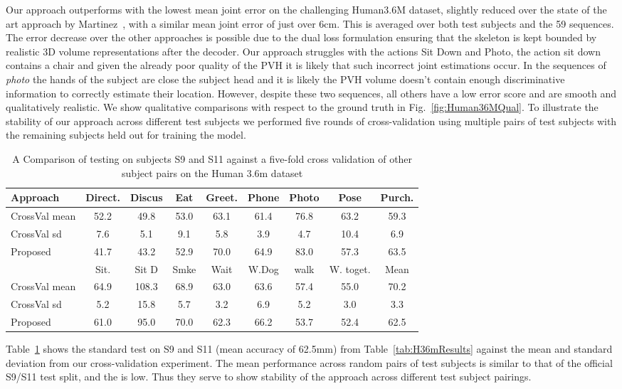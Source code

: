 \documentclass[runningheads]{llncs}
\begin{document}
Our approach outperforms with the lowest mean joint error on the challenging Human3.6M dataset, slightly reduced over the state of the art approach by Martinez~\cite{martinez_simple_2017}, with a similar mean joint error of just over 6cm. This is averaged over both test subjects and the 59 sequences. The error decrease over the other approaches is possible due to the dual loss formulation ensuring that the skeleton is kept bounded by realistic 3D volume representations after the decoder. Our approach struggles with the actions Sit Down and Photo, the action sit down contains a chair and given the already poor quality of the PVH it is likely that such incorrect joint estimations occur. In the sequences of \emph{photo} the hands of the subject are close the subject head and it is likely the PVH volume doesn't contain enough discriminative information to correctly estimate their location. However, despite these two sequences, all others have a low error score and are smooth and qualitatively realistic. We show qualitative comparisons with respect to the ground truth in Fig.~\ref{fig:Human36MQual}. To illustrate the stability of our approach across different test subjects we performed five rounds of cross-validation using multiple pairs of test subjects with the remaining subjects held out for training the model.
\begin{table}[htb]

\centering
{
\small
\begin{tabular}{lcccccccc}
\hline
Approach      & Direct. & Discus & Eat & Greet. &Phone &Photo &Pose &Purch. \\ \hline

CrossVal mean & 52.2    & 49.8   & 53.0&63.1    &61.4  &76.8  &63.2 &59.3   \\
CrossVal sd   & 7.6     & 5.1    & 9.1 &5.8     &3.9   &4.7   &10.4 & 6.9   \\ \hline
Proposed      & 41.7& 43.2& 52.9& 70.0& 64.9& 83.0& 57.3& 63.5\\ \hline

              & Sit. & Sit D & Smke & Wait &W.Dog& walk & W. toget. &Mean\\\hline
CrossVal mean & 64.9 & 108.3 &68.9  &63.0  &63.6 &57.4  &55.0       &70.2  \\
CrossVal sd   & 5.2  &15.8   &5.7   &3.2   &6.9  &5.2   &3.0        &3.3\\ \hline
Proposed      &61.0 &95.0 &70.0 &62.3 &66.2 &53.7 &52.4 &62.5 \\     \hline

\end{tabular}}
\caption{A Comparison of testing on subjects S9 and S11 against a five-fold cross validation of other subject pairs on the Human 3.6m dataset}
\label{tab:H36mResultsCrossVal}
\squeezeup
\squeezeup
\end{table}
Table~\ref{tab:H36mResultsCrossVal} shows the standard test on S9 and S11 (mean accuracy of 62.5mm) from Table~\ref{tab:H36mResults} against the mean and standard deviation from our cross-validation experiment. The mean performance across random pairs of test subjects is similar to that of the official S9/S11 test split, and the  is low.  Thus they serve to show stability of the approach across different test subject pairings. 
\end{document}
